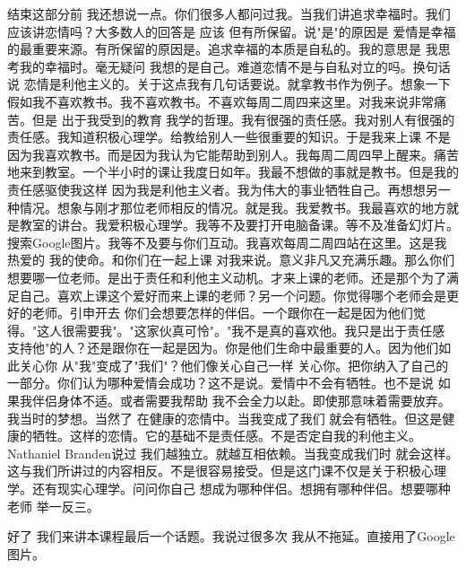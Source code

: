 结束这部分前 我还想说一点。你们很多人都问过我。当我们讲追求幸福时。我们应该讲恋情吗？大多数人的回答是 应该 但有所保留。说"是"的原因是 爱情是幸福的最重要来源。有所保留的原因是。追求幸福的本质是自私的。我的意思是 我思考我的幸福时。毫无疑问 我想的是自己。难道恋情不是与自私对立的吗。换句话说 恋情是利他主义的。关于这点我有几句话要说。就拿教书作为例子。想象一下 假如我不喜欢教书。我不喜欢教书。不喜欢每周二周四来这里。对我来说非常痛苦。但是 出于我受到的教育 我学的哲理。我有很强的责任感。我对别人有很强的责任感。我知道积极心理学。给教给别人一些很重要的知识。于是我来上课 不是因为我喜欢教书。而是因为我认为它能帮助到别人。我每周二周四早上醒来。痛苦地来到教室。一个半小时的课让我度日如年。我最不想做的事就是教书。但是我的责任感驱使我这样 因为我是利他主义者。我为伟大的事业牺牲自己。再想想另一种情况。想象与刚才那位老师相反的情况。就是我。我爱教书。我最喜欢的地方就是教室的讲台。我爱积极心理学。我等不及要打开电脑备课。等不及准备幻灯片。搜索Google图片。我等不及要与你们互动。我喜欢每周二周四站在这里。这是我热爱的 我的使命。和你们在一起上课 对我来说。意义非凡又充满乐趣。那么你们想要哪一位老师。是出于责任和利他主义动机。才来上课的老师。还是那个为了满足自己。喜欢上课这个爱好而来上课的老师？另一个问题。你觉得哪个老师会是更好的老师。引申开去 你们会想要怎样的伴侣。一个跟你在一起是因为他们觉得。"这人很需要我"。"这家伙真可怜"。"我不是真的喜欢他。我只是出于责任感 支持他"的人？还是跟你在一起是因为。你是他们生命中最重要的人。因为他们如此关心你 从"我"变成了"我们"？他们像关心自己一样 关心你。把你纳入了自己的一部分。你们认为哪种爱情会成功？这不是说。爱情中不会有牺牲。也不是说 如果我伴侣身体不适。或者需要我帮助 我不会全力以赴。即使那意味着需要放弃。我当时的梦想。当然了 在健康的恋情中。当我变成了我们 就会有牺牲。但这是健康的牺牲。这样的恋情。它的基础不是责任感。不是否定自我的利他主义。Nathaniel Branden说过 我们越独立。就越互相依赖。当我变成我们时 就会这样。这与我们所讲过的内容相反。不是很容易接受。但是这门课不仅是关于积极心理学。还有现实心理学。问问你自己 想成为哪种伴侣。想拥有哪种伴侣。想要哪种老师 举一反三。 

好了 我们来讲本课程最后一个话题。我说过很多次 我从不拖延。直接用了Google图片。 

